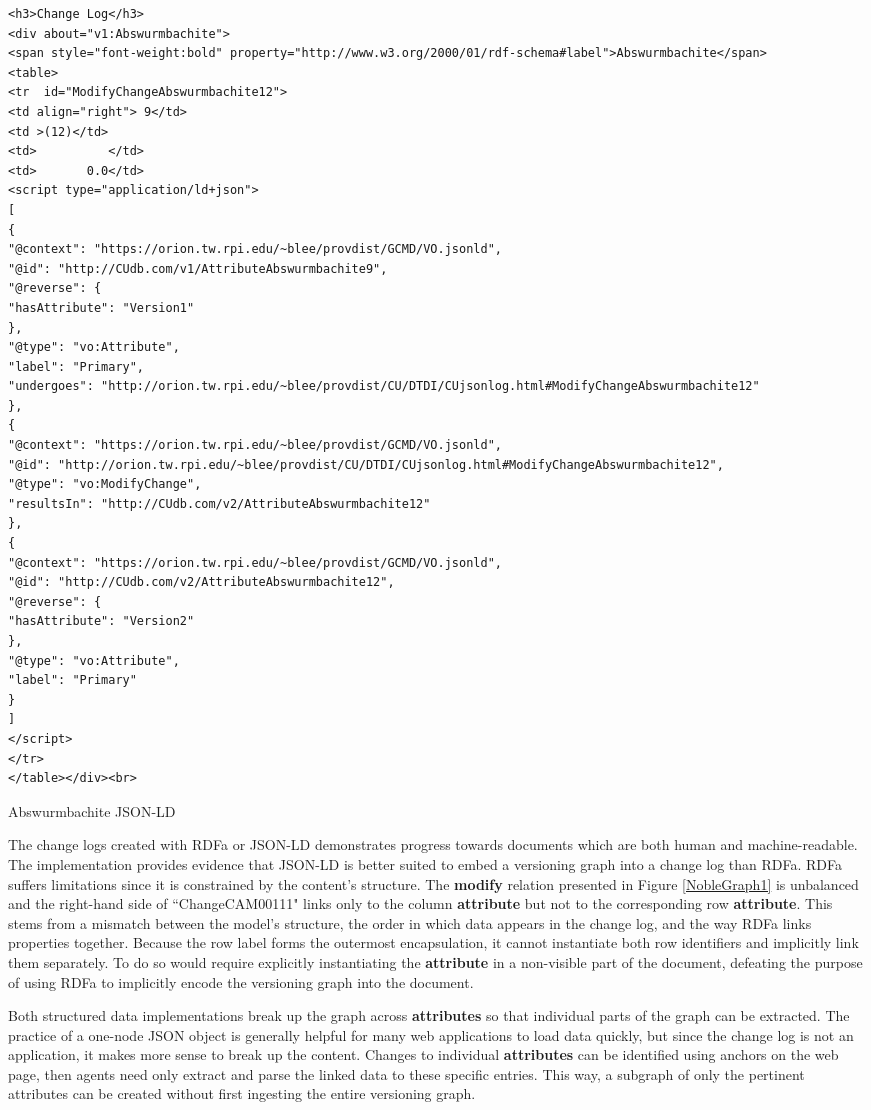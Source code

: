 \begin{listing}
	\begin{verbatim}
<h3>Change Log</h3>
<div about="v1:Abswurmbachite">
<span style="font-weight:bold" property="http://www.w3.org/2000/01/rdf-schema#label">Abswurmbachite</span>
<table>
<tr  id="ModifyChangeAbswurmbachite12">
<td align="right"> 9</td>
<td >(12)</td>
<td>          </td>
<td>       0.0</td>
<script type="application/ld+json">
[
{
"@context": "https://orion.tw.rpi.edu/~blee/provdist/GCMD/VO.jsonld", 
"@id": "http://CUdb.com/v1/AttributeAbswurmbachite9", 
"@reverse": {
"hasAttribute": "Version1"
}, 
"@type": "vo:Attribute", 
"label": "Primary", 
"undergoes": "http://orion.tw.rpi.edu/~blee/provdist/CU/DTDI/CUjsonlog.html#ModifyChangeAbswurmbachite12"
}, 
{
"@context": "https://orion.tw.rpi.edu/~blee/provdist/GCMD/VO.jsonld", 
"@id": "http://orion.tw.rpi.edu/~blee/provdist/CU/DTDI/CUjsonlog.html#ModifyChangeAbswurmbachite12", 
"@type": "vo:ModifyChange", 
"resultsIn": "http://CUdb.com/v2/AttributeAbswurmbachite12"
}, 
{
"@context": "https://orion.tw.rpi.edu/~blee/provdist/GCMD/VO.jsonld", 
"@id": "http://CUdb.com/v2/AttributeAbswurmbachite12", 
"@reverse": {
"hasAttribute": "Version2"
}, 
"@type": "vo:Attribute", 
"label": "Primary"
}
]
</script>
</tr>
</table></div><br>
	\end{verbatim}
	\label{json_list}
	\caption{Abswurmbachite JSON-LD}
\end{listing}
The change logs created with RDFa or JSON-LD demonstrates progress towards documents which are both human and machine-readable.
The implementation provides evidence that JSON-LD is better suited to embed a versioning graph into a change log than RDFa.
RDFa suffers limitations since it is constrained by the content's structure.
The \textbf{modify} relation presented in Figure \ref{NobleGraph1} is unbalanced and the right-hand side of ``ChangeCAM00111" links only to the column \textbf{attribute} but not to the corresponding row \textbf{attribute}.
This stems from a mismatch between the model's structure, the order in which data appears in the change log, and the way RDFa links properties together.
Because the row label forms the outermost encapsulation, it cannot instantiate both row identifiers and implicitly link them separately.
To do so would require explicitly instantiating the \textbf{attribute} in a non-visible part of the document, defeating the purpose of using RDFa to implicitly encode the versioning graph into the document.

Both structured data implementations break up the graph across \textbf{attributes} so that individual parts of the graph can be extracted.
The practice of a one-node JSON object is generally helpful for many web applications to load data quickly, but since the change log is not an application, it makes more sense to break up the content.
Changes to individual \textbf{attributes} can be identified using anchors on the web page, then agents need only extract and parse the linked data to these specific entries.
This way, a subgraph of only the pertinent attributes can be created without first ingesting the entire versioning graph.

